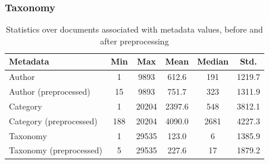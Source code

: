 \subsubsection{Taxonomy}\label{subsec:appendix_taxonomy}

\begin{table}
	\begin{tabular}{l | c | c | c | c | c}
		Metadata & Min & Max & Mean & Median & Std. \\
		\hline
		Author & 1 & 9893 & 612.6 & 191 & 1219.7 \\
		Author (preprocessed) & 15 & 9893 & 751.7 & 323 & 1311.9 \\
		Category & 1 & 20204 & 2397.6 & 548 & 3812.1 \\
		Category (preprocessed) & 188 & 20204 & 4090.0 & 2681 & 4227.3 \\
		Taxonomy & 1 & 29535 & 123.0 & 6 & 1385.9 \\
		Taxonomy (preprocessed) & 5 & 29535 & 227.6 & 17 & 1879.2 \\
	\end{tabular}
	\caption{Statistics over documents associated with metadata values, before and after preprocessing}
	\label{tab:meta_prepro_stats}
\end{table}